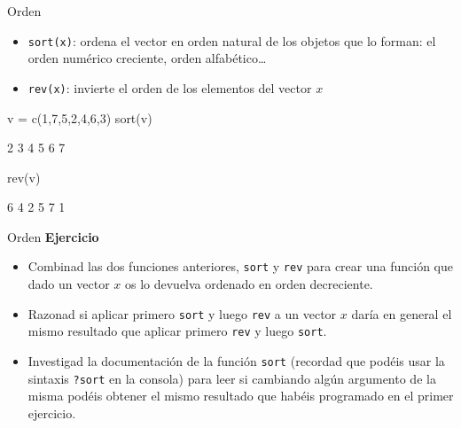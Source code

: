 \documentclass[
  ignorenonframetext,
  aspectratio=169]{beamer}
\newenvironment{Shaded}{\begin{snugshade}}{\end{snugshade}}
\newcommand{\DecValTok}[1]{\textcolor[rgb]{0.00,0.00,0.81}{#1}}
\newcommand{\FunctionTok}[1]{\textcolor[rgb]{0.00,0.00,0.00}{#1}}
\newcommand{\NormalTok}[1]{#1}
\newcommand{\OtherTok}[1]{\textcolor[rgb]{0.56,0.35,0.01}{#1}}
\providecommand{\tightlist}{%
  \setlength{\itemsep}{0pt}\setlength{\parskip}{0pt}}
\let\oldverbatim\verbatim
\let\endoldverbatim\endverbatim
\renewenvironment{verbatim}{\tiny\oldverbatim}{\endoldverbatim}
\begin{document}
\begin{frame}[fragile]{Orden}
\protect\hypertarget{orden}{}
\begin{itemize}
\tightlist
\item
  \texttt{sort(x)}: ordena el vector en orden natural de los objetos que
  lo forman: el orden numérico creciente, orden alfabético\ldots{}
\item
  \texttt{rev(x)}: invierte el orden de los elementos del vector \(x\)
\end{itemize}

\begin{Shaded}
\begin{Highlighting}[]
\NormalTok{v }\OtherTok{=} \FunctionTok{c}\NormalTok{(}\DecValTok{1}\NormalTok{,}\DecValTok{7}\NormalTok{,}\DecValTok{5}\NormalTok{,}\DecValTok{2}\NormalTok{,}\DecValTok{4}\NormalTok{,}\DecValTok{6}\NormalTok{,}\DecValTok{3}\NormalTok{)}
\FunctionTok{sort}\NormalTok{(v)}
\end{Highlighting}
\end{Shaded}

\begin{verbatim}
[1] 1 2 3 4 5 6 7
\end{verbatim}

\begin{Shaded}
\begin{Highlighting}[]
\FunctionTok{rev}\NormalTok{(v)}
\end{Highlighting}
\end{Shaded}

\begin{verbatim}
[1] 3 6 4 2 5 7 1
\end{verbatim}
\end{frame}

\begin{frame}[fragile]{Orden}
\protect\hypertarget{orden-1}{}
\textbf{Ejercicio}

\begin{itemize}
\item
  Combinad las dos funciones anteriores, \texttt{sort} y \texttt{rev}
  para crear una función que dado un vector \(x\) os lo devuelva
  ordenado en orden decreciente.
\item
  Razonad si aplicar primero \texttt{sort} y luego \texttt{rev} a un
  vector \(x\) daría en general el mismo resultado que aplicar primero
  \texttt{rev} y luego \texttt{sort}.
\item
  Investigad la documentación de la función \texttt{sort} (recordad que
  podéis usar la sintaxis \texttt{?sort} en la consola) para leer si
  cambiando algún argumento de la misma podéis obtener el mismo
  resultado que habéis programado en el primer ejercicio.
\end{itemize}
\end{frame}
\end{document}
